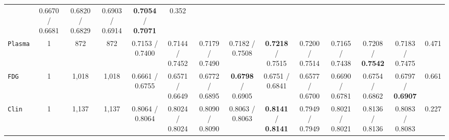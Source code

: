 \documentclass[10pt,twocolumn]{article}
\begin{document}
\begin{table}[t]
{\begin{tabular}{@{}>{\raggedright\arraybackslash}p{2.65cm}ccccccccccccc@{}}
{/\\0.6851} & \shortstack{0.6670 /\\0.6681} & \shortstack{0.6820 /\\0.6829} &
\shortstack{0.6903 /\\0.6914} & \shortstack{\textbf{0.7054} /\\\textbf{0.7071}} & 0.352 \\
\texttt{Plasma} & 1 & 872 & 872 & \shortstack{0.7153 /\\0.7400} & \shortstack{0.7144 /\\0.7452}
& \shortstack{0.7179 /\\0.7490} & \shortstack{0.7182 /\\0.7508} & \shortstack{\textbf{0.7218}
/\\0.7515} & \shortstack{0.7200 /\\0.7514} & \shortstack{0.7165 /\\0.7438} &
\shortstack{0.7208 /\\\textbf{0.7542}} & \shortstack{0.7183 /\\0.7475} & 0.471 \\
\texttt{FDG} & 1 & 1,018 & 1,018 & \shortstack{0.6661 /\\0.6755} & \shortstack{0.6571
/\\0.6649} & \shortstack{0.6772 /\\0.6895} & \shortstack{\textbf{0.6798} /\\0.6905} &
\shortstack{0.6751 /\\0.6841} & \shortstack{0.6577 /\\0.6700} & \shortstack{0.6690 /\\0.6781} &
\shortstack{0.6754 /\\0.6862} & \shortstack{0.6797 /\\\textbf{0.6907}} & 0.661 \\
\texttt{Clin} & 1 & 1,137 & 1,137 & \shortstack{0.8064 /\\0.8064} & \shortstack{0.8024
/\\0.8024} & \shortstack{0.8090 /\\0.8090} & \shortstack{0.8063 /\\0.8063} &
\shortstack{\textbf{0.8141} /\\\textbf{0.8141}} & \shortstack{0.7949 /\\0.7949} &
\shortstack{0.8021 /\\0.8021} & \shortstack{0.8136 /\\0.8136} &
\shortstack{0.8083 /\\0.8083} & 0.227 \\

\end{tabular}}
\end{table}
\end{document}
